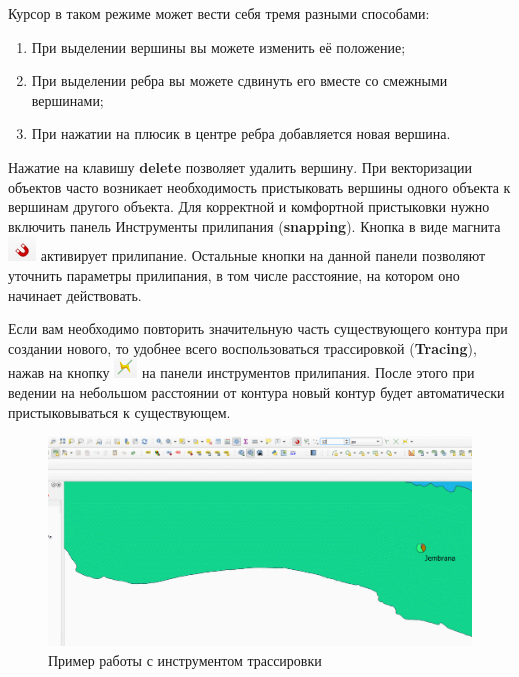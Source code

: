 \documentclass[
  12pt,
]{book}
\begin{document}
Курсор в таком режиме может вести себя тремя разными способами:

\begin{enumerate}
\def\labelenumi{\arabic{enumi})}
\item
  При выделении вершины вы можете изменить её положение;
\item
  При выделении ребра вы можете сдвинуть его вместе со смежными вершинами;
\item
  При нажатии на плюсик в центре ребра добавляется новая вершина.
\end{enumerate}

Нажатие на клавишу \textbf{delete} позволяет удалить вершину. При векторизации объектов часто возникает необходимость пристыковать вершины одного объекта к вершинам другого объекта. Для корректной и комфортной пристыковки нужно включить панель Инструменты прилипания (\textbf{snapping}). Кнопка в виде магнита \includegraphics{images/Practice/Snapping.png} активирует прилипание. Остальные кнопки на данной панели позволяют уточнить параметры прилипания, в том числе расстояние, на котором оно начинает действовать.

Если вам необходимо повторить значительную часть существующего контура при создании нового, то удобнее всего воспользоваться трассировкой (\textbf{Tracing}), нажав на кнопку \includegraphics{images/Practice/Tracing.png} на панели инструментов прилипания. После этого при ведении на небольшом расстоянии от контура новый контур будет автоматически пристыковываться к существующем.

\begin{figure}
\centering
\includegraphics{images/Practice/Tracing.gif}
\caption{Пример работы с инструментом трассировки}
\end{figure}
\end{document}
